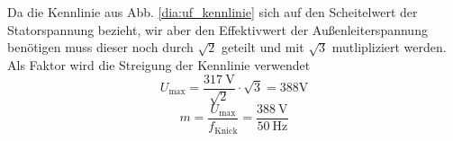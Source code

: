 \chapter{}\label{ex:aufg6}
%
\section{}\label{sec:aufg6a}
%
Da die Kennlinie aus Abb. \ref{dia:uf_kennlinie} sich auf den Scheitelwert der Statorspannung bezieht, wir aber den Effektivwert der Außenleiterspannung
 benötigen muss dieser noch durch $\sqrt 2$ geteilt und mit $\sqrt 3$ mutlipliziert werden.
Als Faktor wird die Streigung der Kennlinie verwendet
\begin{equation}
	U_{\text{max}} = \frac{317~\text{V}}{\sqrt{2}} \cdot \sqrt{3} = 388 \text{V}
\end{equation}
\begin{equation}
	m = \frac{U_{\text{max}}}{f_{\text{Knick}}} = \frac{388~\text{V}}{50~\text{Hz}}
\end{equation}
%
\section{}\label{sec:aufg6b}
%

%
\section{}\label{sec:aufg6c}
%
